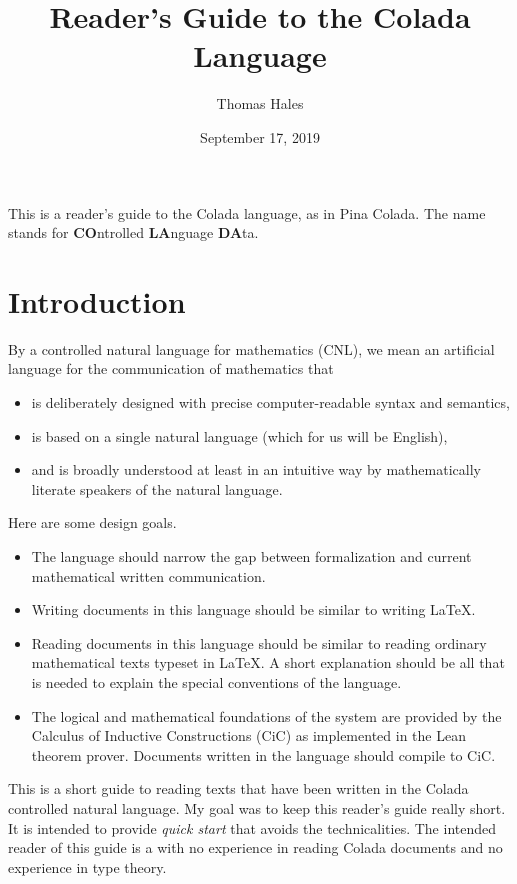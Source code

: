 \documentclass[12pt]{article}
\title{Reader's Guide to the Colada Language}
\date{September 17, 2019}
\author{Thomas Hales}
\numberwithin{definition}{section}
\begin{document}
\maketitle

\setcounter{tocdepth}{1}
\tableofcontents
\newpage

\newcommand{\Nat}{{\mathbb N}}
\newcommand{\Int}{{\mathbb Z}}
\newcommand{\Real}{{\mathbb R}}

This is a reader's guide to the Colada language, as in Pina Colada.  The name
stands for {\bf CO}ntrolled {\bf LA}nguage {\bf DA}ta.

\section{Introduction}


By a controlled natural language for mathematics (CNL), we mean an
artificial language for the communication of mathematics that
\begin{itemize}
\item is deliberately designed with precise computer-readable syntax
  and semantics,
\item is based on a single natural language (which for us will be
  English),
\item and is broadly understood at least in an intuitive way by
  mathematically literate speakers of the natural language.
\end{itemize}




Here are some design goals.
\begin{itemize}
\item The language should narrow the gap between formalization and
  current mathematical written communication.
\item Writing documents in this language should be similar to writing
  \LaTeX.
\item Reading documents in this language should be similar to reading
  ordinary mathematical texts typeset in \LaTeX.  A short explanation
  should be all that is needed to explain the special conventions of
  the language.
\item The logical and mathematical foundations of the system are
  provided by the Calculus of Inductive Constructions (CiC) as
  implemented in the Lean theorem prover.  Documents written in the
  language should compile to CiC.
\end{itemize}


This is a short guide to reading texts that have been written in the
Colada controlled natural language.  My goal was to keep this reader's
guide really short.  It is intended to provide \emph{quick start} that
avoids the technicalities.  The intended reader of this guide is a
with no experience in reading Colada documents and no experience in type theory.
\end{document}
